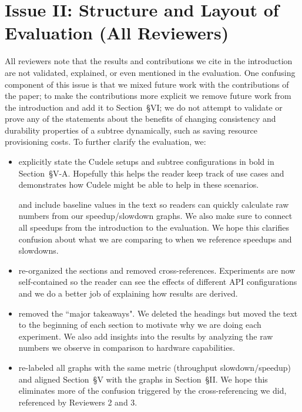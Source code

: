 \documentclass[onecolumn,conference]{IEEEtran}
\begin{document}
\section*{Issue II: Structure and Layout of Evaluation (All Reviewers)}

All reviewers note that the results and contributions we cite in the
introduction are not validated, explained, or even mentioned in the evaluation.
One confusing component of this issue is that we mixed future work with the
contributions of the paper; to make the contributions more explicit we remove
future work from the introduction and add it to Section~{\S}VI; we do not
attempt to validate or prove any of the statements about the benefits of
changing consistency and durability properties of a subtree dynamically, such
as saving resource provisioning costs.  To further clarify the evaluation, we:

\begin{itemize}

  \item explicitly state the Cudele setups and subtree configurations in bold
in Section~{\S}V-A. Hopefully this helps the reader keep track of use cases and
demonstrates how Cudele might be able to help in these scenarios. 

and include baseline values in the
text so readers can quickly calculate raw numbers from our speedup/slowdown
graphs. We also make sure to connect all speedups from the introduction to the
evaluation. We hope this clarifies confusion about what we are comparing to
when we reference speedups and slowdowns.

  \item re-organized the sections and removed cross-references. Experiments are
now self-contained so the reader can see the effects of different API
configurations and we do a better job of explaining how results are derived. 

  \item removed the ``major takeaways". We deleted the headings but moved the
text to the beginning of each section to motivate why we are doing each
experiment.  We also add insights into the results by analyzing the raw numbers
we observe in comparison to hardware capabilities.

  \item re-labeled all graphs with the same metric (throughput
slowdown/speedup) and aligned Section~{\S}V with the graphs in Section~{\S}II.
We hope this eliminates more of the confusion triggered by the
cross-referencing we did, referenced by Reviewers 2 and 3.

\end{itemize}
\end{document}
